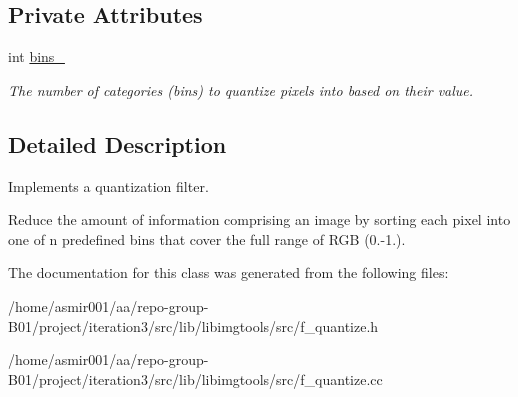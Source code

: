 \subsection*{Private Attributes}
\begin{DoxyCompactItemize}
\item 
int \hyperlink{classimage__tools_1_1FQuantize_a5378d59c5c3d85066a69eb05f138a56d}{bins\+\_\+}\hypertarget{classimage__tools_1_1FQuantize_a5378d59c5c3d85066a69eb05f138a56d}{}\label{classimage__tools_1_1FQuantize_a5378d59c5c3d85066a69eb05f138a56d}

\begin{DoxyCompactList}\small\item\em The number of categories (bins) to quantize pixels into based on their value. \end{DoxyCompactList}\end{DoxyCompactItemize}


\subsection{Detailed Description}
Implements a quantization filter. 

Reduce the amount of information comprising an image by sorting each pixel into one of n predefined bins that cover the full range of R\+GB (0.-\/1.). 

The documentation for this class was generated from the following files\+:\begin{DoxyCompactItemize}
\item 
/home/asmir001/aa/repo-\/group-\/\+B01/project/iteration3/src/lib/libimgtools/src/f\+\_\+quantize.\+h\item 
/home/asmir001/aa/repo-\/group-\/\+B01/project/iteration3/src/lib/libimgtools/src/f\+\_\+quantize.\+cc\end{DoxyCompactItemize}
